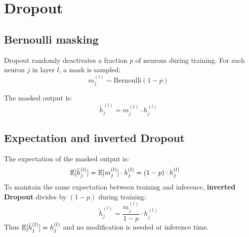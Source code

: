 \section{Dropout}
\label{sec:dropout}

\subsection{Bernoulli masking}

Dropout \cite{srivastava2014dropout} randomly deactivates a fraction $p$
of neurons during training. For each neuron $j$ in layer $l$, a mask is
sampled:
\begin{equation}
m_j^{(l)} \sim \text{Bernoulli}(1 - p)
\end{equation}

The masked output is:
\begin{equation}
\tilde{h}_j^{(l)} = m_j^{(l)} \cdot h_j^{(l)}
\end{equation}

\subsection{Expectation and inverted Dropout}

\begin{theorem}
The expectation of the masked output is:
\begin{align}
\mathbb{E}[\tilde{h}_j^{(l)}]
&= \mathbb{E}[m_j^{(l)}] \cdot h_j^{(l)} = (1 - p) \cdot h_j^{(l)}
\end{align}
To maintain the same expectation between training and inference,
\textbf{inverted Dropout} divides by $(1-p)$ during training:
\begin{equation}
\tilde{h}_j^{(l)} = \frac{m_j^{(l)}}{1 - p} \cdot h_j^{(l)}
\label{eq:inverted-dropout}
\end{equation}
Thus $\mathbb{E}[\tilde{h}_j^{(l)}] = h_j^{(l)}$ and no modification is needed
at inference time.
\end{theorem}

